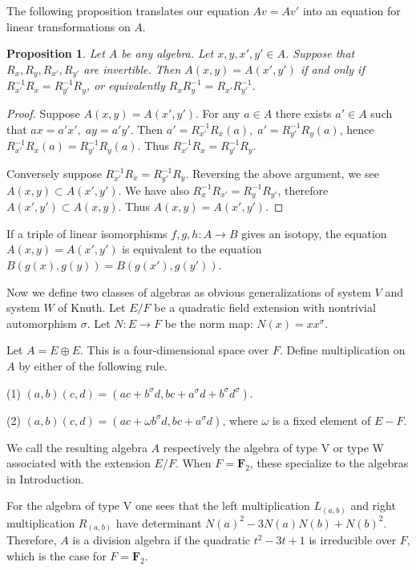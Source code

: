 \documentclass{article}
\newtheorem{prop}[thm]{Proposition}
\newcommand{\bF}{\mathbf{F}}
\begin{document}
The following proposition translates our equation $Av=Av'$ into an equation for linear transformations on $A$.


\begin{prop}
Let $A$ be any algebra.
Let $x,y,x',y'\in A$. Suppose that $R_{x},R_{y},R_{x'}, R_{y'}$ are invertible.
Then $A(x,y)=A(x',y')$ if and only if 
$R_{x'}^{-1}R_{x}=R_{y'}^{-1}R_{y}$, or equivalently
$R_{x}R_{y}^{-1}=R_{x'}R_{y'}^{-1}$.

\end{prop}

\medskip
\begin{proof}
Suppose $A(x,y)=A(x',y')$. For any $a\in A$ there exists $a'\in A$ such that
$ax=a'x',\;ay=a'y'$.
Then
$a'=R_{x'}^{-1}R_{x}(a), \;
a'=R_{y'}^{-1}R_{y}(a)$,
hence
$R_{x'}^{-1}R_{x}(a)=R_{y'}^{-1}R_{y}(a)$.
Thus $R_{x'}^{-1}R_{x}=R_{y'}^{-1}R_{y}$.

Conversely suppose $R_{x'}^{-1}R_{x}=R_{y'}^{-1}R_{y}$.
Reversing the above argument, we see $A(x,y)\subset A(x',y')$.
We have also $R_{x}^{-1}R_{x'}=R_{y}^{-1}R_{y'}$,  therefore
$A(x',y')\subset A(x,y)$.
Thus $A(x,y)=A(x',y')$.
\end{proof}

If a triple of linear isomorphisms $f,g,h\colon A\to B$ gives an isotopy,
the equation $A(x,y)=A(x',y')$ is equivalent to the equation
$B(g(x),g(y))=B(g(x'), g(y'))$.



Now we define two classes of algebras as
obvious generalizations of system $V$ and system $W$ of Knuth.  
Let $E/F$ be a quadratic field extension with nontrivial automorphism $\sigma$.
Let $N\colon E\to F$ be the norm map: $N(x)=xx^{\sigma}$.

Let $A=E\oplus E$. This is  a four-dimensional space over $F$.
Define multiplication on $A$ by either of the following rule. 

\noindent
(1)  
$(a,b)(c,d)=(ac+b^{\sigma}d, bc+a^{\sigma}d+b^{\sigma}d^{\sigma})$.

\noindent
(2)  
$(a,b)(c,d)=(ac+\omega b^{\sigma}d, bc+a^{\sigma}d)$,
where $\omega$ is a fixed element of $E-F$.

We call the resulting algebra $A$ respectively the algebra of type V or type W associated with the extension $E/F$.
When $F=\bF_2$, these specialize to the algebras in Introduction.

For the algebra of type V one sees that the left multiplication $L_{(a,b)}$ and right multiplication $R_{(a,b)}$ have determinant
$N(a)^2-3N(a)N(b)+N(b)^2$.
Therefore, $A$ is a division algebra if the quadratic $t^2-3t+1$ is irreducible over $F$, which is the case for $F=\bF_2$. 
\end{document}

